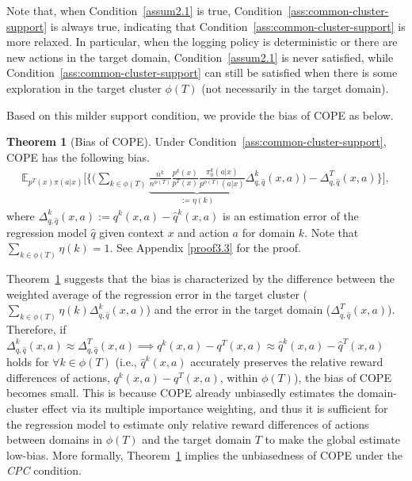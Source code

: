 \documentclass{article} %
\theoremstyle{definition}
\newtheorem{thm}{Theorem}[section]
\begin{document}
Note that, when Condition~\ref{assum2.1} is true, Condition~\ref{ass:common-cluster-support} is always true, indicating that Condition~\ref{ass:common-cluster-support} is more relaxed. In particular, when the logging policy is deterministic or there are new actions in the target domain, Condition~\ref{assum2.1} is never satisfied, while Condition~\ref{ass:common-cluster-support} can still be satisfied when there is some exploration in the target cluster $\phi(T)$ (not necessarily in the target domain).

Based on this milder support condition, we provide the bias of COPE as below.

\begin{thm}[Bias of COPE]
\label{thm:bias-of-COPE}
Under Condition~\ref{ass:common-cluster-support}, COPE has the following bias. 
\begin{align}
    \mathbb{E}_{p^T(x)\pi(a|x)} \bigg[ \bigg\{ \bigg( \sum_{k\in\phi(T)} \underbrace{\frac{n^k}{n^{\phi(T)}}\frac{p^{k}(x)}{p^{T}(x)}\frac{\pi_0^{k}(a|x)}{p^{\phi(T)}(a|x)}}_{:=\eta(k)}\Delta_{q,\hat{q}}^k(x,a) \bigg)-\Delta_{q,\hat{q}}^T(x,a) \bigg\} \bigg], \label{eq:bias_of_COPE}
\end{align}
where $\Delta_{q,\hat{q}}^k(x,a) := q^{k}(x, a) - \hat{q}^{k}(x, a)$ is an estimation error of the regression model $\hat{q}$ given context $x$ and action $a$ for domain $k$. Note that $\sum_{k\in\phi(T)} \eta(k) = 1$. See Appendix \ref{proof3.3} for the proof.
\end{thm}

Theorem~\ref{thm:bias-of-COPE} suggests that the bias is characterized by the difference between the weighted average of the regression error in the target cluster ($ \sum_{k\in\phi(T)} \eta(k) \Delta_{q,\hat{q}}^k(x,a)$) and the error in the target domain ($ \Delta_{q,\hat{q}}^T(x,a) $). Therefore, if $ \Delta_{q,\hat{q}}^k(x,a) \approx \Delta_{q,\hat{q}}^T(x,a) \implies  q^k(x,a) - q^T(x,a) \approx \hat{q}^k(x,a) - \hat{q}^T(x,a) $ holds for $\forall k \in \phi(T)$ (i.e., $\hat{q}^k(x,a)$ accurately preserves the relative reward differences of actions, $q^k(x,a) - q^T(x,a)$, within $\phi(T)$), the bias of COPE becomes small. This is because COPE already unbiasedly estimates the domain-cluster effect via its multiple importance weighting, and thus it is sufficient for the regression model to estimate only relative reward differences of actions between domains in $\phi(T)$ and the target domain $T$ to make the global estimate low-bias. More formally, Theorem~\ref{thm:bias-of-COPE} implies the unbiasedness of COPE under the \textit{CPC} condition.
\end{document}
